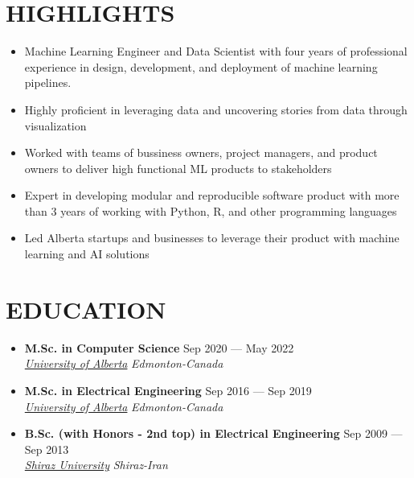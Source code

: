 \documentclass[10pt,a4paper,sans]{moderncv} %
\begin{document}
	
	\makecvtitle
	
\vspace{-1cm}
    \section{HIGHLIGHTS}
    \begin{itemize}
    	\item Machine Learning Engineer and Data Scientist with four years of professional experience in design, development, and deployment of machine learning pipelines.
    	\item Highly proficient in leveraging data and uncovering stories from data through visualization
    	\item Worked with teams of bussiness owners, project managers, and product owners to deliver high functional ML products to stakeholders
    	\item Expert in developing modular and reproducible software product with more than 3 years of working with Python, R, and other programming languages
    	\item Led Alberta startups and businesses to leverage their product with machine learning and AI solutions

    \end{itemize}
	
	\section{EDUCATION}

	\begin{itemize}
		\item \textbf{M.Sc. in Computer Science} \hfill Sep 2020 --- May 2022 \\ 
		\href{https://ualberta.ca/}{ \emph{University of Alberta}} \hfill \emph{Edmonton-Canada}
		
		\item \textbf{M.Sc. in Electrical Engineering} \hfill Sep 2016 --- Sep 2019 \\ 
		\href{https://ualberta.ca/}{ \emph{University of Alberta}} \hfill \emph{Edmonton-Canada}
		
		\item \textbf{B.Sc. (with Honors - 2nd top) in Electrical Engineering} \hfill Sep 2009 --- Sep 2013 \\ 
		\href{https://ualberta.ca/}{ \emph{Shiraz University}} \hfill \emph{Shiraz-Iran}

	\end{itemize}
	
\end{document}
